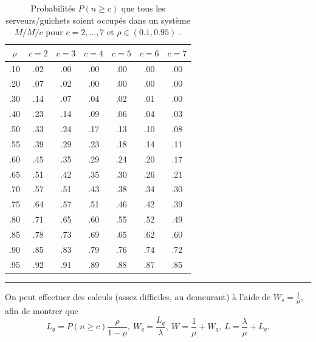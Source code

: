 \begin{table}[!t]
\centering
\begin{tabular}{ccccccc}
\hline
$\rho$ & $c=2$ & $c=3$ & $c=4$ & $c=5$ & $c=6$ & $c=7$ \\
 \hline
.10& .02& .00& .00& .00& .00& .00 \\
.20& .07& .02& .00& .00& .00& .00 \\
.30& .14& .07& .04& .02& .01& .00 \\
.40& .23& .14& .09& .06& .04& .03 \\
.50& .33& .24& .17& .13& .10& .08 \\
.55& .39& .29& .23& .18& .14& .11 \\
.60& .45& .35& .29& .24& .20& .17 \\
.65& .51& .42& .35& .30& .26& .21 \\
.70& .57& .51& .43& .38& .34& .30 \\
.75& .64& .57& .51& .46& .42& .39 \\
.80& .71& .65& .60& .55& .52& .49 \\
.85& .78& .73& .69& .65& .62& .60 \\
.90& .85& .83& .79& .76& .74& .72 \\
.95& .92& .91& .89& .88& .87& .85 \\
\hline
\end{tabular}
\caption{\small Probabilités $P(n\geq c)$ que tous les serveurs/guichets soient occupés dans un système $M/M/c$ pour $c=2,\ldots, 7$ et $\rho\in (0.1,0.95)$ \cite[p.1088]{QS_W}.}\label{tab:pns}\hrule
\end{table}%
On peut effectuer des calculs (assez difficiles, au demeurant) à l'aide de $W_{s} = \frac{1}{\mu}$, afin de montrer que $$ L_{q} = P( n \geq c) \frac{\rho}{1-\rho}, \ 
W_{q} = \frac{L_{q}}{\lambda}, \ 
W = \frac{1}{\mu} + W_{q}, \ 
 L = \frac{\lambda}{\mu} + L_{q}.$$ 
